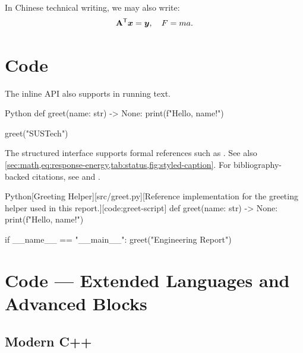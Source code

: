 \documentclass[titlepage=formal,logo=assets/校徽+中英文校名-上下.pdf,code=listings]{SUSTechHomework}
\begin{document}
In Chinese technical writing, we may also write:
\[
  \mathbf{A}^{\mathsf{T}}\boldsymbol{x} = \boldsymbol{y}, \quad F = m a.
\]

\section{Code}\label{sec:code}

The inline API also supports  in running text.

\begin{sustechcode}{Python}
def greet(name: str) -> None:
    print(f"Hello, {name}!")

greet("SUSTech")
\end{sustechcode}


The structured interface supports formal references such as .
See also \cref{sec:math,eq:response-energy,tab:status,fig:styled-caption}.
For bibliography-backed citations, see \textcite{shannon1948mathematical} and \parencite{ctan-biblatex}.

\begin{sustechcodeblock}{Python}[Greeting Helper][src/greet.py][Reference implementation for the greeting helper used in this report.][code:greet-script]
def greet(name: str) -> None:
    print(f"Hello, {name}!")


if __name__ == "__main__":
    greet("Engineering Report")
\end{sustechcodeblock}


\section{Code --- Extended Languages and Advanced Blocks}\label{sec:code-extended}

\subsection{Modern C++}
\end{document}
